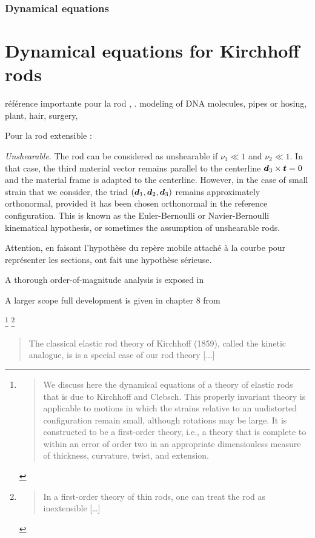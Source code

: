 \subsubsection{Dynamical equations}


\clearpage
\section{Dynamical equations for Kirchhoff rods}

référence importante pour la rod \cite{Moulton2013} , \cite[p.~109]{Villaggio1997}.
modeling of DNA molecules, pipes or hosing, plant, hair, surgery, 

Pour la rod extensible : \cite{Cisternas2002}

\emph{Unshearable}. The rod can be considered as unshearable if $\nu_1 \ll 1$ and $\nu_2 \ll 1$. In that case, the third material vector remains parallel to the centerline  $\boldsymbol{d}_3 \times \boldsymbol{t} = 0$ and the material frame is adapted to the centerline. 
However, in the case of small strain that we consider, the triad $(\boldsymbol{d}_1,\boldsymbol{d}_2,\boldsymbol{d}_3)$ remains approximately orthonormal, provided it has been chosen orthonormal in the reference configuration. This is known as the Euler-Bernoulli or Navier-Bernoulli kinematical hypothesis, or sometimes the assumption of unshearable rods. 



Attention, en faisant l'hypothèse du repère mobile attaché à la courbe pour représenter les sections, ont fait une hypothèse sérieuse.

A thorough order-of-magnitude analysis is exposed in \cite{Dill1992, Coleman1993}

A larger scope full development is given in chapter 8 from \cite[pp.~270-274]{Antman2005}

\footnote{\blockcquote[p.~1]{Coleman1993}{We discuss here the dynamical equations of a theory of elastic rods that is due to Kirchhoff and Clebsch. This properly invariant theory is applicable to motions in which the strains relative to an undistorted configuration remain small, although rotations may be large. It is constructed to be a first-order theory, i.e., a theory that is complete to within an error of order two in an appropriate dimensionless measure of thickness, curvature, twist, and extension.}}
\footnote{\blockcquote[p.~1]{Coleman1993}{In a first-order theory of thin rods, one can treat the rod as inextensible [\dots]}}


\blockcquote[p.~238]{Antman2005}{The classical elastic rod theory of Kirchhoff (1859), called the kinetic analogue, is is a special case of our rod theory [...]}


